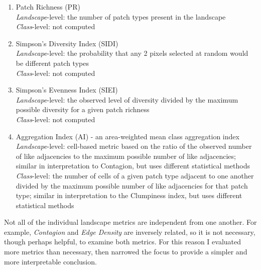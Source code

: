 \begin{enumerate}
	\item Patch Richness (PR)\\
	\emph{Landscape}-level: the number of patch types present in the landscape	\\
	\emph{Class}-level: not computed \\
	
	\item Simpson's Diversity Index (SIDI)\\
	\emph{Landscape}-level: the probability that any 2 pixels selected at random would be different patch types	\\
	\emph{Class}-level: not computed\\
	
	\item Simpson's Evenness Index (SIEI) \\
	\emph{Landscape}-level:  the observed level of diversity divided by the maximum possible diversity for a given patch richness 	\\
	\emph{Class}-level: not computed\\
	
	\item Aggregation Index (AI) - an area-weighted mean class aggregation index \\
	\emph{Landscape}-level: cell-based metric based on the ratio of the observed number of like adjacencies to the maximum possible number of like adjacencies; similar in interpretation to Contagion, but uses different statistical methods
	\emph{Class}-level: the number of cells of a given patch type adjacent to one another divided by the maximum possible number of like adjacencies for that patch type; similar in interpretation to the Clumpiness index, but uses different statistical methods	\\
\end{enumerate}

Not all of the individual landscape metrics are independent from one another. For example, \emph{Contagion} and \emph{Edge Density} are inversely related, so it is not necessary, though perhaps helpful, to examine both metrics. For this reason I evaluated more metrics than necessary, then narrowed the focus to provide a simpler and more interpretable conclusion.
